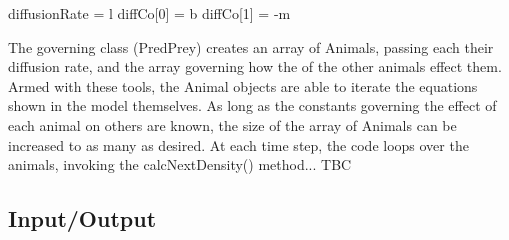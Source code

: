 \documentclass[11pt]{report}
\begin{document}
diffusionRate = l
diffCo[0] = b
diffCo[1] = -m


The governing class (PredPrey) creates an array of Animals, passing each their diffusion rate, and the array  governing how the of the other animals effect them. Armed with these tools, the Animal objects are able to iterate the equations shown in the model themselves. As long as the constants governing the effect of each animal on others are known, the size of the array of Animals can be increased to as many as desired.
	At each time step, the code loops over the animals, invoking the calcNextDensity() method... TBC  

\subsection{Input/Output} %
      
          
       
      
\end{document}

